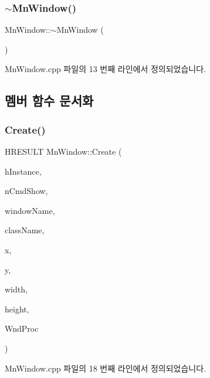 \subsubsection{\texorpdfstring{$\sim$\+Mn\+Window()}{~MnWindow()}}
{\footnotesize\ttfamily Mn\+Window\+::$\sim$\+Mn\+Window (\begin{DoxyParamCaption}{ }\end{DoxyParamCaption})}



Mn\+Window.\+cpp 파일의 13 번째 라인에서 정의되었습니다.



\subsection{멤버 함수 문서화}
\mbox{\label{class_m_n_l_1_1_mn_window_aaa2478013ccab0097369c641b5f6a62e}} 
\subsubsection{\texorpdfstring{Create()}{Create()}}
{\footnotesize\ttfamily H\+R\+E\+S\+U\+LT Mn\+Window\+::\+Create (\begin{DoxyParamCaption}\item[{H\+I\+N\+S\+T\+A\+N\+CE}]{h\+Instance,  }\item[{int}]{n\+Cmd\+Show,  }\item[{std\+::wstring}]{window\+Name,  }\item[{std\+::wstring}]{class\+Name,  }\item[{float}]{x,  }\item[{float}]{y,  }\item[{float}]{width,  }\item[{float}]{height,  }\item[{W\+N\+D\+P\+R\+OC}]{Wnd\+Proc }\end{DoxyParamCaption})}



Mn\+Window.\+cpp 파일의 18 번째 라인에서 정의되었습니다.

\mbox{\label{class_m_n_l_1_1_mn_window_abd7d89c761943fe7d1752bd75322b6dd}} 
